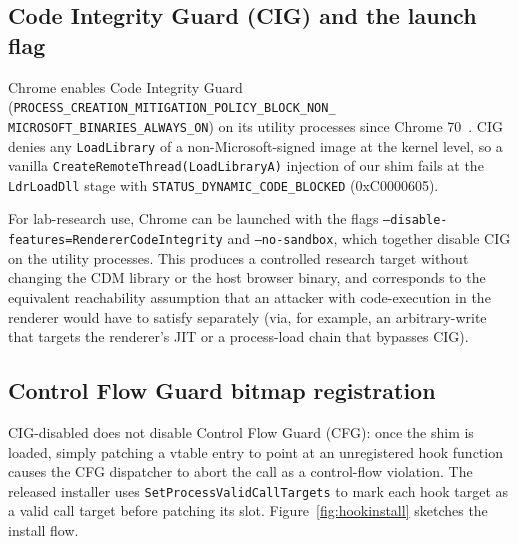 \documentclass[11pt,letterpaper]{article}
\begin{document}
\subsection{Code Integrity Guard (CIG) and the launch flag}
\label{sec:runtime-cig}

Chrome enables Code Integrity Guard
(\texttt{PROCESS\_CREATION\_MITIGATION\_POLICY\_BLOCK\_NON\_\\MICROSOFT\_BINARIES\_ALWAYS\_ON})
on its utility processes since Chrome 70~\cite{chromium-cig}. CIG
denies any \texttt{LoadLibrary} of a non-Microsoft-signed image at
the kernel level, so a vanilla \texttt{CreateRemoteThread(LoadLibraryA)}
injection of our shim fails at the \texttt{LdrLoadDll} stage with
\texttt{STATUS\_DYNAMIC\_CODE\_BLOCKED} (0xC0000605).

For lab-research use, Chrome can be launched with the flags
\texttt{--disable-features=}\linebreak[1]\texttt{RendererCodeIntegrity}
and \texttt{--no-sandbox}, which together disable CIG on the
utility processes.
This produces a controlled research target without changing the
CDM library or the host browser binary, and corresponds to the
equivalent reachability assumption that an attacker with
code-execution in the renderer would have to satisfy separately
(via, for example, an arbitrary-write that targets the renderer's
JIT or a process-load chain that bypasses CIG).

\subsection{Control Flow Guard bitmap registration}
\label{sec:runtime-cfg}

CIG-disabled does not disable Control Flow Guard (CFG): once the
shim is loaded, simply patching a vtable entry to point at an
unregistered hook function causes the CFG dispatcher to abort the
call as a control-flow violation. The released installer uses
\texttt{SetProcessValidCallTargets} to mark each hook target as a
valid call target before patching its slot. Figure~\ref{fig:hookinstall}
sketches the install flow.
\end{document}
